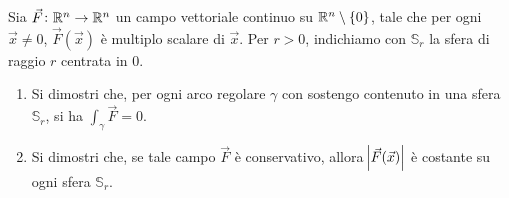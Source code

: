 \begin{vares}
  Sia $ \vec{F} \colon \mathbb{R}^n \to \mathbb{R}^n $ un campo vettoriale continuo su $ \mathbb{R}^n \setminus \{0\} $, tale che per ogni $ \vec{x} \neq 0 $, $ \vec{F}(\vec{x}) $ è multiplo scalare di $ \vec{x} $. Per $ r > 0 $, indichiamo con $ \mathbb{S}_r $ la sfera di raggio $ r $ centrata in 0.
  \begin{enumerate}[label = (\roman*)]
  \item Si dimostri che, per ogni arco regolare $ \gamma $ con sostengo contenuto in una sfera $ \mathbb{S}_r $, si ha $ \int_{\gamma} \vec{F} = 0 $.
  \item Si dimostri che, se tale campo $ \vec{F} $ è conservativo, allora $ \abs{\vec{F}(\vec{x})} $ è costante su ogni sfera $ \mathbb{S}_r $.
  \end{enumerate}
\end{vares}
%

